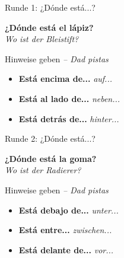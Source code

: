 \documentclass[aspectratio=169, 11pt]{beamer}
\newcommand{\de}[1]{{\small\textcolor{dunkelgrau}{\textit{#1}}}}
\newcommand{\estar}[1]{\textbf{\textcolor{blau}{#1}}}
\begin{document}
\begin{frame}{Runde 1: ¿Dónde está...?}

\begin{center}
{\Huge\bfseries \estar{¿Dónde está el lápiz?}}\\[0.3em]
{\large\textcolor{dunkelgrau}{\textit{Wo ist der Bleistift?}}}
\end{center}

\vspace{0.8cm}

\begin{block}{Hinweise geben \de{-- Dad pistas}}
\begin{itemize}
    \item \estar{Está encima de...} \de{auf...}
    \item \estar{Está al lado de...} \de{neben...}
    \item \estar{Está detrás de...} \de{hinter...}
\end{itemize}
\end{block}

\end{frame}

\begin{frame}{Runde 2: ¿Dónde está...?}

\begin{center}
{\Huge\bfseries \estar{¿Dónde está la goma?}}\\[0.3em]
{\large\textcolor{dunkelgrau}{\textit{Wo ist der Radierer?}}}
\end{center}

\vspace{0.8cm}

\begin{block}{Hinweise geben \de{-- Dad pistas}}
\begin{itemize}
    \item \estar{Está debajo de...} \de{unter...}
    \item \estar{Está entre...} \de{zwischen...}
    \item \estar{Está delante de...} \de{vor...}
\end{itemize}
\end{block}

\end{frame}
\end{document}
